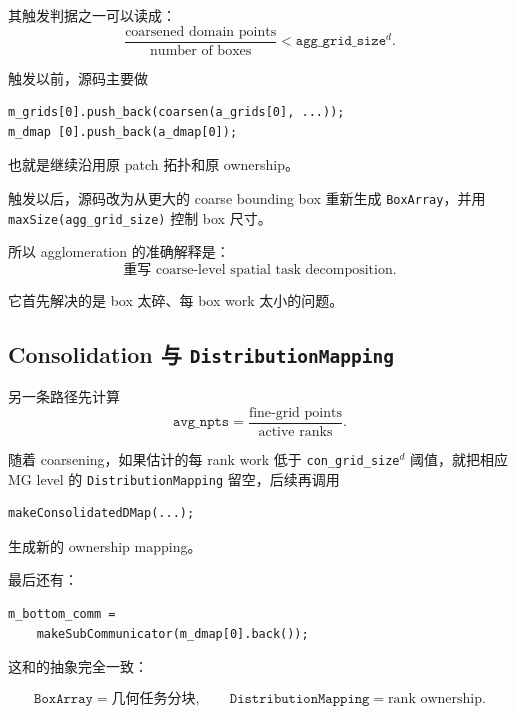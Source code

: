 其触发判据之一可以读成：
\begin{equation}
\frac{\text{coarsened domain points}}
{\text{number of boxes}}
<
\texttt{agg\_grid\_size}^{d}.
\end{equation}

触发以前，源码主要做
\begin{verbatim}
m_grids[0].push_back(coarsen(a_grids[0], ...));
m_dmap [0].push_back(a_dmap[0]);
\end{verbatim}

也就是继续沿用原 patch 拓扑和原 ownership。

触发以后，源码改为从更大的 coarse bounding box 重新生成
\texttt{BoxArray}，并用 \texttt{maxSize(agg\_grid\_size)} 控制 box 尺寸。

所以 agglomeration 的准确解释是：
\begin{equation}
\boxed{
\text{重写 coarse-level spatial task decomposition}.
}
\end{equation}

它首先解决的是 box 太碎、每 box work 太小的问题。

\subsection{Consolidation 与 \texttt{DistributionMapping}}

另一条路径先计算
\begin{equation}
\texttt{avg\_npts}
=
\frac{\text{fine-grid points}}
{\text{active ranks}}.
\end{equation}

随着 coarsening，如果估计的每 rank work 低于
\texttt{con\_grid\_size}$^d$ 阈值，就把相应 MG level 的
\texttt{DistributionMapping} 留空，后续再调用

\begin{verbatim}
makeConsolidatedDMap(...);
\end{verbatim}

生成新的 ownership mapping。

最后还有：

\begin{verbatim}
m_bottom_comm =
    makeSubCommunicator(m_dmap[0].back());
\end{verbatim}

这和的抽象完全一致：

\begin{equation}
\boxed{
\texttt{BoxArray}
=
\text{几何任务分块},
\qquad
\texttt{DistributionMapping}
=
\text{rank ownership}.
}
\label{eq:software-amrex-ba-dm}
\end{equation}

